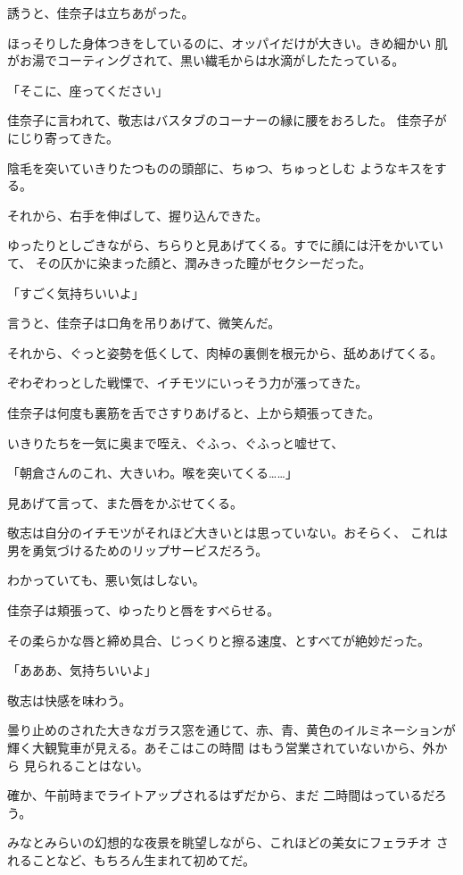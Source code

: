 ﻿\documentclass[
    book,tate,
    line_length=30zw,
    jafontsize=12pt,
    paper=b5j,
    landscape,
    ]{jlreq}
\begin{document}
誘うと、佳奈子は立ちあがった。

ほっそりした身体つきをしているのに、オッパイだけが大きい。きめ細かい
肌がお湯でコーティングされて、黒い繊毛からは水滴がしたたっている。

「そこに、座ってください」

佳奈子に言われて、敬志はバスタブのコーナーの縁に腰をおろした。
佳奈子がにじり寄ってきた。

陰毛を突いていきりたつものの頭部に、ちゅつ、ちゅっとしむ
ようなキスをする。

それから、右手を伸ばして、握り込んできた。

ゆったりとしごきながら、ちらりと見あげてくる。すでに顔には汗をかいていて、
その仄かに染まった顔と、潤みきった瞳がセクシーだった。

「すごく気持ちいいよ」

言うと、佳奈子は口角を吊りあげて、微笑んだ。

それから、ぐっと姿勢を低くして、肉棹の裏側を根元から、舐めあげてくる。

ぞわぞわっとした戦慄で、イチモツにいっそう力が漲ってきた。

佳奈子は何度も裏筋を舌でさすりあげると、上から頬張ってきた。

いきりたちを一気に奥まで咥え、ぐふっ、ぐふっと嘘せて、

「朝倉さんのこれ、大きいわ。喉を突いてくる……」

見あげて言って、また唇をかぶせてくる。

敬志は自分のイチモツがそれほど大きいとは思っていない。おそらく、
これは男を勇気づけるためのリップサービスだろう。

わかっていても、悪い気はしない。

佳奈子は頬張って、ゆったりと唇をすべらせる。

その柔らかな唇と締め具合、じっくりと擦る速度、とすべてが絶妙だった。

「あああ、気持ちいいよ」

敬志は快感を味わう。

曇り止めのされた大きなガラス窓を通じて、赤、青、黄色のイルミネーションが
輝く大観覧車が見える。あそこはこの時間 はもう営業されていないから、外から
見られることはない。

確か、午前時までライトアップされるはずだから、まだ
二時間はっているだろう。

みなとみらいの幻想的な夜景を眺望しながら、これほどの美女にフェラチオ
されることなど、もちろん生まれて初めてだ。
\end{document}
